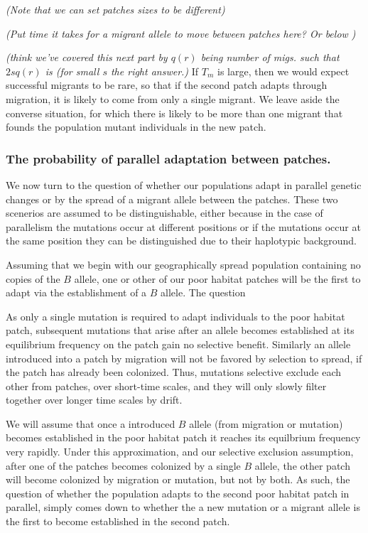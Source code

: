\documentclass{article}
\newcommand{\gc}[1]{{\it\color{green}(#1)} }
\begin{document}
\gc{Note that we can set patches sizes to be different}

\gc{Put time it takes for a migrant allele to move between patches
  here? Or below }

\gc{think we've covered this next part by $q(r)$ being number of migs. such
that $2sq(r)$ is (for small $s$ the right answer.}
If $T_m$ is large, then we would expect successful migrants to be rare,
so that if the second patch adapts through migration, it is likely to come from only a single migrant.
We leave aside the converse situation, for which there is likely to be more than one migrant
that founds the population mutant individuals in the new patch.


\subsubsection{The probability of parallel adaptation between patches.} 
\label{ss:probparallel}
We now turn to the question of whether our populations adapt in
parallel genetic changes or by the spread of a migrant allele between the
patches. These two scenerios are assumed to be distinguishable, either
because in the case of parallelism the mutations occur at different
positions or if the mutations occur at the same position they can be
distinguished due to their haplotypic background. 

Assuming that we begin with our geographically 
spread population containing no copies of the $B$ allele, one or other
of our poor habitat patches will be the first to adapt via the
establishment of a $B$ allele. The question 

As only a single mutation is required to adapt individuals to the
poor habitat patch, subsequent mutations that arise after an allele
becomes established at its equilibrium frequency on the patch gain no selective
benefit. Similarly an allele introduced into a patch by migration will
not be favored by selection to spread, if the patch has already been
colonized. Thus, mutations selective exclude each other from
patches, over short-time scales, and they will only slowly filter
together over longer time scales by drift. 

We will assume that once a introduced $B$ allele (from migration or mutation) becomes
established in the poor habitat patch it reaches its equilbrium
frequency very rapidly. Under this approximation, and our selective
exclusion assumption, after one of the patches becomes colonized by a
single $B$ allele, the other patch will become colonized by migration or
mutation, but not by both. As such, the question of whether the
population adapts to the second poor habitat patch in parallel, simply comes down to whether the a new mutation or a migrant allele
is the first to become established in the second patch. 
\end{document}
